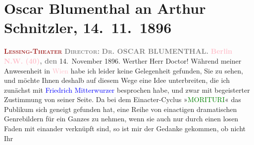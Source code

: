 

               \section[Oscar Blumenthal an Arthur Schnitzler, 14. 11. 1896]{ Oscar Blumenthal an Arthur Schnitzler, 14. 11. 1896}\nopagebreak{}\rehead{ }\normalsize\beginnumbering{} \toendnotes[C]{\smallbreak\pagebreak[2]} 
\pstart
           \noindent{}\centering{}{\pb}\textcolor{gray}{\textbf{\textcolor{brown}{\textsc{Lessing-Theater}}{}\ledrightnote{\textcolor{brown}{Lessing-Theater}}}}\pend
           \pstart
           \noindent{}\centering{}\textcolor{gray}{\textbf{\textsc{Director}:}}{ }\textcolor{gray}{\textbf{\textsc{Dr.}{ }OSCAR BLUMENTHAL.}}\pend
           \pstart
           \raggedleft{}\textcolor{gray}{\textbf{\textcolor{pink}{Berlin N.W. (40)}{}\ledrightnote{\textcolor{pink}{Berlin}}, den}}{ }14. November 1896.\pend
           \pstart\center{}Werther Herr Doctor!\pend\pstart
           Während meiner Anwesenheit in \textcolor{pink}{Wien}{}\ledrightnote{\textcolor{pink}{Wien}} habe ich
                    leider keine Gelegenheit gefunden, Sie zu sehen, und möchte Ihnen deshalb auf
                    diesem Wege eine Idee unterbreiten, die ich zunächst mit \textcolor{blue}{Friedrich Mitterwurzer}{}\ledrightnote{\textcolor{blue}{Friedrich Mitterwurzer}} besprochen habe, und zwar mit
                    begeisterter Zustimmung von seiner Seite. Da bei dem Einacter-Cyclus »\textcolor{green}{MORITURI}{}\ledrightnote{\textcolor{green}{Morituri}}« das
                    Publikum sich geneigt gefunden hat, eine Reihe von einactigen dramatischen
                    Genrebildern für ein Ganzes zu nehmen, wenn sie auch nur durch einen losen Faden
                    mit einander verknüpft sind, so ist mir der Gedanke gekommen, ob nicht Ihr
